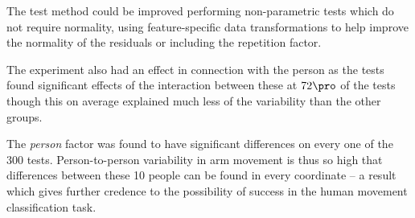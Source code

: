 \documentclass[11pt,fleqn]{article}
\begin{document}
The test method could be improved performing non-parametric tests which do not require normality, using feature-specific data transformations to help improve the normality of the residuals or including the repetition factor.

The experiment also had an effect in connection  with the person as the tests found significant effects of the interaction between these at \(72\pro\) of the tests though this on average explained much less of the variability than the other groups.

The \textit{person} factor was found to have significant differences on every one of the 300 tests. Person-to-person variability in arm movement is thus so high that differences between these 10 people can be found in every coordinate -- a result which gives further credence to the possibility of success in the human movement classification task.






%
%
\end{document}
